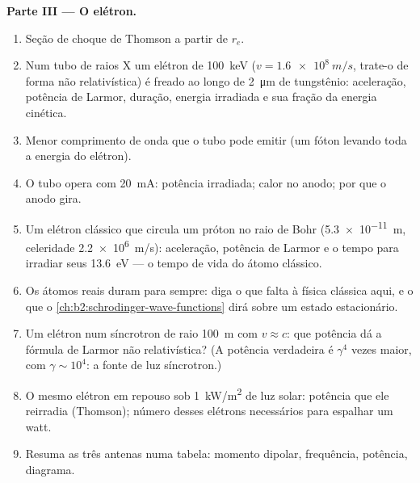 \begin{problem}
\medskip
\noindent\textbf{Parte III --- O elétron.}
\begin{enumerate}[resume]
  \item Seção de choque de Thomson a partir de $r_e$.
  \item Num tubo de raios X um elétron de \qty{100}{keV} ($v = \qty{1.6e8}{m/s}$,
        trate-o de forma não relativística) é freado ao longo de \qty{2}{\micro m} de
        tungstênio: aceleração, potência de Larmor, duração, energia
        irradiada e sua fração da energia cinética.
  \item Menor comprimento de onda que o tubo pode emitir (um fóton levando
        toda a energia do elétron).
  \item O tubo opera com \qty{20}{mA}: potência irradiada; calor no anodo;
        por que o anodo gira.
  \item Um elétron clássico que circula um próton no raio de Bohr
        (\qty{5.3e-11}{m}, celeridade \qty{2.2e6}{m/s}): aceleração, potência de
        Larmor e o tempo para irradiar seus \qty{13.6}{eV} --- o
        tempo de vida do átomo clássico.
  \item Os átomos reais duram para sempre: diga o que falta à física clássica
        aqui, e o que o \cref{ch:b2:schrodinger-wave-functions} dirá
        sobre um estado estacionário.
  \item Um elétron num síncrotron de raio \qty{100}{m} com $v \approx c$:
        que potência dá a fórmula de Larmor não relativística? (A
        potência verdadeira é $\gamma^4$ vezes maior, com $\gamma \sim 10^4$: a
        fonte de luz síncrotron.)
  \item O mesmo elétron em repouso sob \qty{1}{kW/m^2} de luz solar:
        potência que ele reirradia (Thomson); número desses elétrons
        necessários para espalhar um watt.
  \item Resuma as três antenas numa tabela: momento dipolar,
        frequência, potência, diagrama.
\end{enumerate}
\end{problem}
